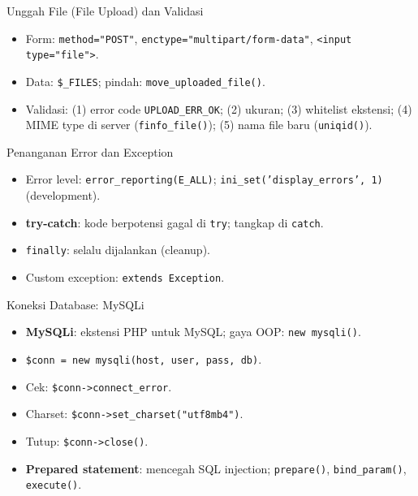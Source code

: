 \documentclass[handout]{beamer}
\begin{document}
\begin{frame}{Unggah File (File Upload) dan Validasi}
	\begin{itemize}
		\item Form: \texttt{method="POST"}, \texttt{enctype="multipart/form-data"}, \texttt{<input type="file">}.
		\item Data: \texttt{\$\_FILES}; pindah: \texttt{move\_uploaded\_file()}.
		\item Validasi: (1) error code \texttt{UPLOAD\_ERR\_OK}; (2) ukuran; (3) whitelist ekstensi; (4) MIME type di server (\texttt{finfo\_file()}); (5) nama file baru (\texttt{uniqid()}).
	\end{itemize}
\end{frame}

\begin{frame}{Penanganan Error dan Exception}
	\begin{itemize}
		\item Error level: \texttt{error\_reporting(E\_ALL)}; \texttt{ini\_set('display\_errors', 1)} (development).
		\item \textbf{try-catch}: kode berpotensi gagal di \texttt{try}; tangkap di \texttt{catch}.
		\item \texttt{finally}: selalu dijalankan (cleanup).
		\item Custom exception: \texttt{extends Exception}.
	\end{itemize}
\end{frame}

\begin{frame}{Koneksi Database: MySQLi}
	\begin{itemize}
		\item \textbf{MySQLi}: ekstensi PHP untuk MySQL; gaya OOP: \texttt{new mysqli()}.
		\item \texttt{\$conn = new mysqli(host, user, pass, db)}.
		\item Cek: \texttt{\$conn->connect\_error}.
		\item Charset: \texttt{\$conn->set\_charset("utf8mb4")}.
		\item Tutup: \texttt{\$conn->close()}.
		\item \textbf{Prepared statement}: mencegah SQL injection; \texttt{prepare()}, \texttt{bind\_param()}, \texttt{execute()}.
	\end{itemize}
\end{frame}
\end{document}
